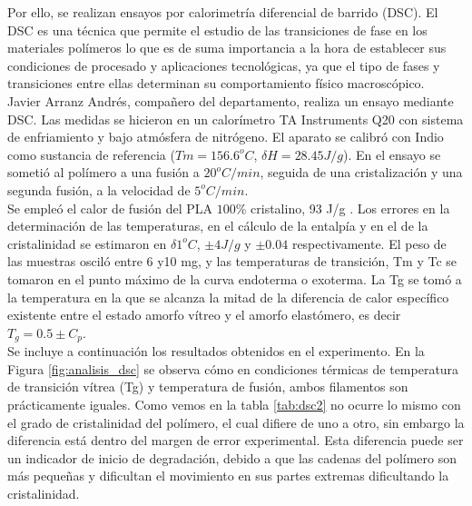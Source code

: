Por ello, se realizan ensayos por calorimetría diferencial de barrido (DSC). El DSC es una técnica que permite el estudio de las transiciones de fase en los materiales polímeros \cite{DSC1} lo que es de suma importancia a la hora de establecer sus condiciones de procesado y aplicaciones tecnológicas, ya que el tipo de fases y transiciones entre ellas determinan su comportamiento físico macroscópico.\\

Javier Arranz Andrés, compañero del departamento, realiza un ensayo mediante DSC. Las medidas se hicieron en un calorímetro TA Instruments Q20 con sistema de enfriamiento y bajo atmósfera de nitrógeno. El aparato se calibró con Indio como sustancia de referencia ($Tm = 156.6 ^o C$, $\delta H = 28.45 J/g$). En el ensayo se sometió al polímero a una fusión a $20 ^o C/min$, seguida de una cristalización y una segunda fusión, a la velocidad de $5 ^o C/min$.\\

Se empleó el calor de fusión del PLA $100\%$ cristalino, 93 J/g \cite{DSC}. Los errores en la determinación de las temperaturas, en el cálculo de la entalpía y en el de la cristalinidad se estimaron en $\delta1 ^o C$, $\pm4 J/g$ y $\pm0.04$ respectivamente. El peso de las muestras osciló entre 6 y10 mg, y las temperaturas de transición, Tm y Tc se tomaron en el punto máximo de la curva endoterma o exoterma. La Tg se tomó a la temperatura en la que se alcanza la mitad de la diferencia de calor específico existente entre el estado amorfo vítreo y el amorfo elastómero, es decir $T_{g} = 0.5 \pm C_{p}$.\\

Se incluye a continuación los resultados obtenidos en el experimento. En la Figura \ref{fig:analisis_dsc} se observa cómo en condiciones térmicas de temperatura de transición vítrea (Tg) y temperatura de fusión, ambos filamentos son prácticamente iguales. Como vemos en la tabla \ref{tab:dsc2} no ocurre lo mismo con el grado de cristalinidad del polímero, el cual difiere de uno a otro, sin embargo la diferencia está dentro del margen de error experimental. Esta diferencia puede ser un indicador de inicio de degradación, debido a que las cadenas del polímero son más pequeñas y dificultan el movimiento en sus partes extremas dificultando la cristalinidad.\\

